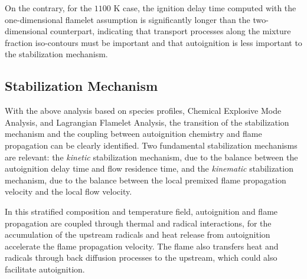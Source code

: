 On the contrary, for the $1100$ K case, the ignition delay time computed with the one-dimensional flamelet assumption is significantly longer than the two-dimensional counterpart, indicating that transport processes along the mixture fraction iso-contours must be important and that autoignition is less important to the stabilization mechanism.

\subsection{Stabilization Mechanism} \label{sec:regime}

With the above analysis based on species profiles, Chemical Explosive Mode Analysis, and Lagrangian Flamelet Analysis, the transition of the stabilization mechanism and the coupling between autoignition chemistry and flame propagation can be clearly identified.  Two fundamental stabilization mechanisms are relevant: the \emph {kinetic} stabilization mechanism, due to the balance between the autoignition delay time and flow residence time, and the \emph {kinematic} stabilization mechanism, due to the balance between the local premixed flame propagation velocity and the local flow velocity.  

In this stratified composition and temperature field, autoignition and flame propagation are coupled through thermal and radical interactions, for the accumulation of the upstream radicals and heat release from autoignition accelerate the flame propagation velocity.  The flame also transfers heat and radicals through back diffusion processes to the upstream, which could also facilitate autoignition.

